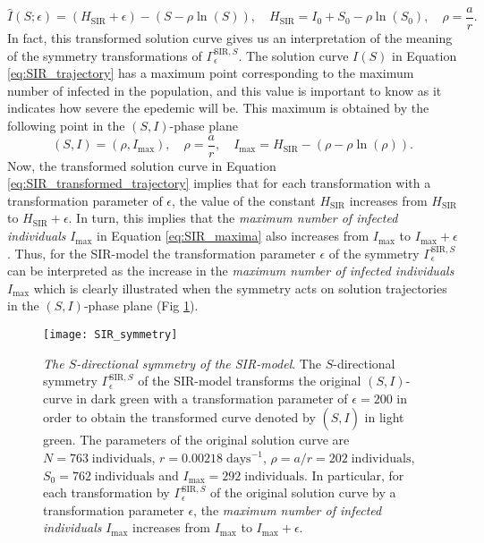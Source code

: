 \begin{equation}
\hat{I}(S;\epsilon)=(H_{\mathrm{SIR}}+\epsilon)-(S-\rho\ln(S)),\quad H_{\mathrm{SIR}}=I_0+S_0-\rho\ln(S_0),\quad\rho=\dfrac{a}{r}.
  \label{eq:SIR_transformed_trajectory}
\end{equation}
In fact, this transformed solution curve gives us an interpretation of the meaning of the symmetry transformations of $\Gamma^{\mathrm{SIR},S}_\epsilon$. The solution curve $I(S)$ in Equation \eqref{eq:SIR_trajectory} has a maximum point corresponding to the maximum number of infected in the population, and this value is important to know as it indicates how severe the epedemic will be. This maximum is obtained by the following point in the $(S,I)$-phase plane \cite{murray2002}
\begin{equation}
    (S,I)=(\rho,I_{\max}),\quad\rho=\dfrac{a}{r},\quad I_{\max}=H_{\mathrm{SIR}}-\left(\rho-\rho\ln\left(\rho\right)\right).
\label{eq:SIR_maxima}
  \end{equation}
Now, the transformed solution curve in Equation \eqref{eq:SIR_transformed_trajectory} implies that for each transformation with a transformation parameter of $\epsilon$, the value of the constant $H_{\mathrm{SIR}}$ increases from $H_{\mathrm{SIR}}$ to $H_{\mathrm{SIR}}+\epsilon$. In turn, this implies that the \textit{maximum number of infected individuals} $I_{\max}$ in Equation \eqref{eq:SIR_maxima} also increases from $I_{\max}$ to $I_{\max}+\epsilon$. Thus, for the SIR-model the transformation parameter $\epsilon$ of the symmetry $\Gamma^{\mathrm{SIR},S}_{\epsilon}$ can be interpreted as the increase in the \textit{maximum number of infected individuals} $I_{\max}$ which is clearly illustrated when the symmetry acts on solution trajectories in the $(S,I)$-phase plane (Fig \ref{fig:SIR_symmetry}). 


\begin{figure}[htbp!]
  \begin{center}
\texttt{[image: SIR\_symmetry]}
\caption{\textit{The $S$-directional symmetry of the SIR-model}. The $S$-directional symmetry $\Gamma^{\mathrm{SIR},S}_{\epsilon}$ of the SIR-model transforms the original $(S,I)$-curve in dark green with a transformation parameter of $\epsilon=200$ in order to obtain the transformed curve denoted by $(\hat{S},I)$ in light green. The parameters of the original solution curve are $N=763\;\mathrm{individuals}$, $r=0.00218\;\mathrm{days}^{-1}$, $\rho=a/r=202\;\mathrm{individuals}$, $S_0=762\;\mathrm{individuals}$ and $I_{\max}=292\;\mathrm{individuals}$. In particular, for each transformation by $\Gamma^{\mathrm{SIR},S}_{\epsilon}$ of the original solution curve by a transformation parameter $\epsilon$, the \textit{maximum number of infected individuals} $I_{\max}$ increases from $I_{\max}$ to $I_{\max}+\epsilon$. }
\label{fig:SIR_symmetry}
\end{center}
\end{figure}


